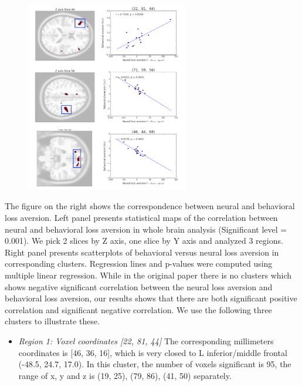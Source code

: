 \documentclass[11pt]{article}
\begin{document}
\begin{figure}
  \begin{center}
    \includegraphics[width=0.63\textwidth]{figures/Regression3/corr_neu_bah.png} 
  \end{center}
\end{figure}

The figure on the right shows the correspondence between neural and behavioral 
loss aversion. Left panel presents statistical maps of the correlation between 
neural and behavioral loss aversion in whole brain analysis (Significant level 
= 0.001). We pick 2 slices by Z axis, one slice by Y axis and analyzed 3 
regions. Right panel presents scatterplots of behavioral versus neural loss 
aversion in corresponding clusters. Regression lines and p-values were computed 
using multiple linear regression. While in the original paper there is no 
clusters which shows negative significant correlation between the neural loss 
aversion and behavioral loss aversion, our results shows that there are both 
significant positive correlation and significant negative correlation. We use 
the following three clusters to illustrate these.

\begin{itemize}
\item \emph{Region 1: Voxel coordinates [22, 81, 44]} The corresponding 
millimeters coordinates is [46, 36, 16], which is very closed to L 
inferior/middle frontal (-48.5, 24.7, 17.0). In this cluster, the number of 
voxels significant is 95, the range of x, y and z is (19, 25), (79, 86), 
(41, 50) separately.
\end{itemize}
\end{document}
